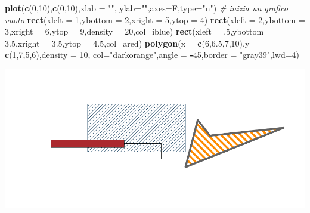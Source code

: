 \documentclass[
  11pt,
]{book}
\newenvironment{Shaded}{\begin{snugshade}}{\end{snugshade}}
\newcommand{\AttributeTok}[1]{\textcolor[rgb]{0.13,0.29,0.53}{#1}}
\newcommand{\CommentTok}[1]{\textcolor[rgb]{0.56,0.35,0.01}{\textit{#1}}}
\newcommand{\DecValTok}[1]{\textcolor[rgb]{0.00,0.00,0.81}{#1}}
\newcommand{\FloatTok}[1]{\textcolor[rgb]{0.00,0.00,0.81}{#1}}
\newcommand{\FunctionTok}[1]{\textcolor[rgb]{0.13,0.29,0.53}{\textbf{#1}}}
\newcommand{\NormalTok}[1]{#1}
\newcommand{\SpecialCharTok}[1]{\textcolor[rgb]{0.81,0.36,0.00}{\textbf{#1}}}
\newcommand{\StringTok}[1]{\textcolor[rgb]{0.31,0.60,0.02}{#1}}
\theoremstyle{mytheoremstyle}
\theoremstyle{mydefstyle}
\begin{document}
\begin{Shaded}
\begin{Highlighting}[]
\FunctionTok{plot}\NormalTok{(}\FunctionTok{c}\NormalTok{(}\DecValTok{0}\NormalTok{,}\DecValTok{10}\NormalTok{),}\FunctionTok{c}\NormalTok{(}\DecValTok{0}\NormalTok{,}\DecValTok{10}\NormalTok{),}\AttributeTok{xlab =} \StringTok{""}\NormalTok{, }\AttributeTok{ylab=}\StringTok{""}\NormalTok{,}\AttributeTok{axes=}\NormalTok{F,}\AttributeTok{type=}\StringTok{"n"}\NormalTok{) }\CommentTok{\# inizia un grafico vuoto }
\FunctionTok{rect}\NormalTok{(}\AttributeTok{xleft =} \DecValTok{1}\NormalTok{,}\AttributeTok{ybottom =} \DecValTok{2}\NormalTok{,}\AttributeTok{xright =} \DecValTok{5}\NormalTok{,}\AttributeTok{ytop =} \DecValTok{4}\NormalTok{)}
\FunctionTok{rect}\NormalTok{(}\AttributeTok{xleft =} \DecValTok{2}\NormalTok{,}\AttributeTok{ybottom =} \DecValTok{3}\NormalTok{,}\AttributeTok{xright =} \DecValTok{6}\NormalTok{,}\AttributeTok{ytop =} \DecValTok{9}\NormalTok{,}\AttributeTok{density =} \DecValTok{20}\NormalTok{,}\AttributeTok{col=}\NormalTok{iblue)}
\FunctionTok{rect}\NormalTok{(}\AttributeTok{xleft =}\NormalTok{ .}\DecValTok{5}\NormalTok{,}\AttributeTok{ybottom =} \FloatTok{3.5}\NormalTok{,}\AttributeTok{xright =} \FloatTok{3.5}\NormalTok{,}\AttributeTok{ytop =} \FloatTok{4.5}\NormalTok{,}\AttributeTok{col=}\NormalTok{ared)}
\FunctionTok{polygon}\NormalTok{(}\AttributeTok{x =} \FunctionTok{c}\NormalTok{(}\DecValTok{6}\NormalTok{,}\FloatTok{6.5}\NormalTok{,}\DecValTok{7}\NormalTok{,}\DecValTok{10}\NormalTok{),}\AttributeTok{y =} \FunctionTok{c}\NormalTok{(}\DecValTok{1}\NormalTok{,}\DecValTok{7}\NormalTok{,}\DecValTok{5}\NormalTok{,}\DecValTok{6}\NormalTok{),}\AttributeTok{density =} \DecValTok{10}\NormalTok{,}
        \AttributeTok{col=}\StringTok{"darkorange"}\NormalTok{,}\AttributeTok{angle =} \SpecialCharTok{{-}}\DecValTok{45}\NormalTok{,}\AttributeTok{border =} \StringTok{"gray39"}\NormalTok{,}\AttributeTok{lwd=}\DecValTok{4}\NormalTok{)}
\end{Highlighting}
\end{Shaded}

\begin{center}\includegraphics{Appunti_di_Statistica_2025_files/figure-latex/24-Libro-29,-1} \end{center}
\end{document}
